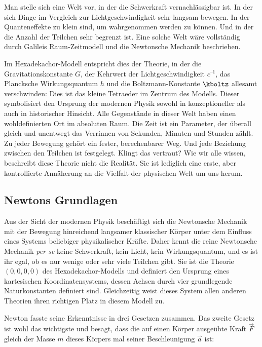 
\newpage {}
\label{sec:0000}

Man stelle sich eine Welt vor, in der die Schwerkraft vernachlässigbar ist. In der sich Dinge im Vergleich zur Lichtgeschwindigkeit sehr langsam bewegen. In der Quanteneffekte zu klein sind, um wahrgenommen werden zu können. Und in der die Anzahl der Teilchen sehr begrenzt ist. Eine solche Welt wäre vollständig durch Galileis Raum-Zeitmodell und die Newtonsche Mechanik beschrieben.

Im Hexadekachor-Modell entspricht dies der Theorie, in der die Gravitationskonstante $G$, der Kehrwert der Lichtgeschwindigkeit $c^{–1}$, das Plancksche Wirkungsquantum $h$ und die Boltzmann-Konstante $\kboltz$ allesamt verschwinden: Dies ist das kleine Tetraeder im Zentrum des Modells. Dieser symbolisiert den Ursprung der modernen Physik sowohl in konzeptioneller als auch in historischer Hinsicht. Alle Gegenstände in dieser Welt haben einen wohldefinierten Ort im absoluten Raum. Die Zeit ist ein Parameter, der überall gleich und unentwegt das Verrinnen von Sekunden, Minuten und Stunden zählt. Zu jeder Bewegung gehört ein fester, berechenbarer Weg. Und jede Beziehung zwischen den Teilchen ist festgelegt. Klingt das vertraut? Wie wir alle wissen, beschreibt diese Theorie nicht die Realität. Sie ist lediglich eine erste, aber kontrollierte Annäherung an die Vielfalt der physischen Welt um uns herum.


\subsection*{Newtons Grundlagen}

Aus der Sicht der modernen Physik beschäftigt sich die Newtonsche Mechanik mit der Bewegung hinreichend langsamer klassischer Körper unter dem Einfluss eines Systems beliebiger physikalischer Kräfte. Daher kennt die reine Newtonsche Mechanik \textit{per se} keine Schwerkraft, kein Licht, kein Wirkungsquantum, und es ist ihr egal, ob es nur wenige oder sehr viele Teilchen gibt. Sie ist die Theorie $(0,0,0,0)$ des Hexadekachor-Modells und definiert den Ursprung eines kartesischen Koordinatensystems, dessen Achsen durch vier grundlegende Naturkonstanten definiert sind. Gleichzeitig weist dieses System allen anderen Theorien ihren richtigen Platz in diesem Modell zu.

Newton fasste seine Erkenntnisse in drei Gesetzen zusammen. Das zweite Gesetz ist wohl das wichtigste und besagt, dass die auf einen Körper ausgeübte Kraft $\vec{F}$ gleich der Masse $m$ dieses Körpers mal seiner Beschleunigung $\vec{a}$ ist:

